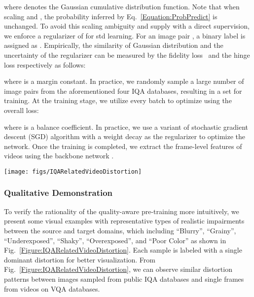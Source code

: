 \documentclass[journal]{IEEEtran}
\begin{document}
where  denotes the Gaussian cumulative distribution function. Note that when scaling  and , the probability  inferred by Eq.~\eqref{Equation:ProbPredict} is unchanged. To avoid this scaling ambiguity and supply  with a direct supervision, we enforce a regularizer of  for std learning. For an image pair , a binary label  is assigned as .
Empirically, the similarity of Gaussian distribution and the uncertainty of the regularizer can be measured by the fidelity loss~\cite{tsai2007frank} and the hinge loss respectively as follows:



where  is a margin constant. In practice, we randomly sample a large number of image pairs from the aforementioned four IQA databases, resulting in a set  for training. At the training stage, we utilize every batch  to optimize  using the overall loss:

where  is a balance coefficient. In practice, we use a variant of stochastic gradient descent (SGD) algorithm with a  weight decay as the regularizer  to optimize the network. Once the training is completed, we extract the frame-level features of videos using the backbone network .

\begin{figure*}[htbp]
  \centering
  \captionsetup{justification=centering}
  \texttt{[image: figs/IQARelatedVideoDistortion]}
  \caption{Comparison with images from IQA databases and single frames of videos from VQA databases. The top row presents the images from IQA databases including BID~\cite{ciancio2010no}, LIVE Challenge~\cite{ghadiyaram2016massive}, KonIQ-10k~\cite{hosu2020koniq}, and SPAQ~\cite{fang2020perceptual}. And the bottom row presents the frames of videos sampled from VQA databases covering CVD2014~\cite{nuutinen2016cvd2014}, KoNViD-1k~\cite{hosu2017konstanz}, LIVE-Qualcomm~\cite{ghadiyaram2018capture}, LIVE-VQC~\cite{sinno2019large}, YouTube-UGC~\cite{wang2019youtube}, and LSVQ~\cite{ying2021patch}.}\label{Figure:IQARelatedVideoDistortion}
\end{figure*}

\subsubsection{Qualitative Demonstration}\label{Subsubsec:QualitativeDemonstration}
To verify the rationality of the quality-aware pre-training more intuitively, we present some visual examples with representative types of realistic impairments between the source and target domains, which including ``Blurry'', ``Grainy'', ``Underexposed'', ``Shaky'', ``Overexposed'', and ``Poor Color'' as shown in Fig.~\ref{Figure:IQARelatedVideoDistortion}. Each sample is labeled with a single dominant distortion for better visualization. From Fig.~\ref{Figure:IQARelatedVideoDistortion}, we can observe similar distortion patterns between images sampled from public IQA databases and single frames from videos on VQA databases.
\end{document}
